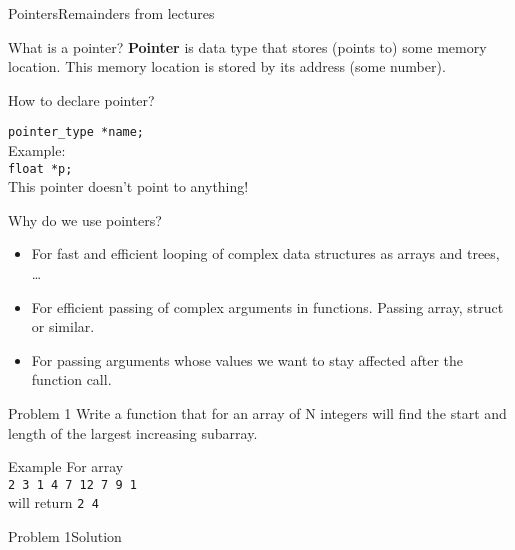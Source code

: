 

\begin{frame}[fragile,shrink=10]{Pointers}{Remainders from lectures}
  \begin{block}{What is a pointer?}
    \textbf{Pointer} is \alert{data type} that stores (points to) some memory
    location. This memory location is stored by its address (some number).
  \end{block}
  \begin{block}{How to declare pointer?}
  
    \texttt{pointer\_type *name;}\\
    Example:\\
    \texttt{float *p;}\\
    \alert{This pointer doesn't point to anything!}
  \end{block}
  \begin{block}{Why do we use pointers?}
    \begin{itemize}
      \item For fast and efficient looping of complex data structures as arrays
      and trees, \ldots
      \item For efficient passing of complex arguments in functions. Passing
      array, struct or similar.
      \item For passing arguments whose values we want to stay affected after
      the function call.
    \end{itemize}
  \end{block}
  
\end{frame}

\begin{frame}{Problem 1}
Write a function that for an array of N integers will find the start and length
of the largest increasing subarray.
\begin{exampleblock}{Example}
For array\\
\texttt{2 3 {\color{red}1 4 7 12} 7 9 1}\\
will return \texttt{2 4}
\end{exampleblock}
\end{frame}

\begin{frame}[fragile]{Problem 1}{Solution}
\begin{columns}


\end{columns}
\end{frame}


